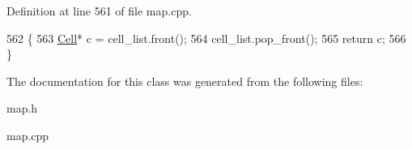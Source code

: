 Definition at line 561 of file map.\+cpp.


\begin{DoxyCode}
562 \{
563     \hyperlink{class_cell}{Cell}* c = cell\_list.front();
564     cell\_list.pop\_front();
565     \textcolor{keywordflow}{return} c;
566 \}
\end{DoxyCode}


The documentation for this class was generated from the following files\+:\begin{DoxyCompactItemize}
\item 
map.\+h\item 
map.\+cpp\end{DoxyCompactItemize}
